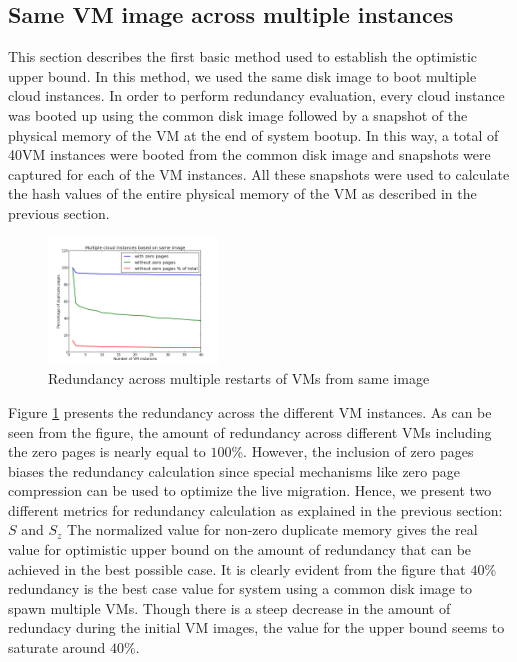 \documentclass{acm_proc_article-sp}
\begin{document}
\subsection{Same VM image across multiple instances}
This section describes the first basic method used to establish the optimistic upper bound. In this method, we used the same disk image to boot multiple cloud instances. In order to perform redundancy evaluation, every cloud instance was booted up using the common disk image followed by a snapshot of the physical memory of the VM at the end of system bootup. In this way, a total of 40VM instances were booted from the common disk image and snapshots were captured for each of the VM instances. All these snapshots were used to calculate the hash values of the entire physical memory of the VM as described in the previous section.

\begin{figure}
  \centering
  \includegraphics[width=0.4\textwidth]{images/samevm_multiplerestarts.png}
  \caption{Redundancy across multiple restarts of VMs from same image}\label{fig:multiple_restarts}
\end{figure}

Figure \ref{fig:multiple_restarts} presents the redundancy across the different VM instances. As can be seen from the figure, the amount of redundancy across different VMs including the zero pages is nearly equal to $100$\%. However, the inclusion of zero pages biases the redundancy calculation since special mechanisms like zero page compression can be used to optimize the live migration. Hence, we present two different metrics for redundancy calculation as explained in the previous section: $S$ and $S_{z}$ The normalized value for non-zero duplicate memory gives the real value for optimistic upper bound on the amount of redundancy that can be achieved in the best possible case. It is clearly evident from the figure that $40$\% redundancy is the best case value for system using a common disk image to spawn multiple VMs. Though there is a steep decrease in the amount of redundacy during the initial VM images, the value for the upper bound seems to saturate around $40$\%.	
\end{document}
